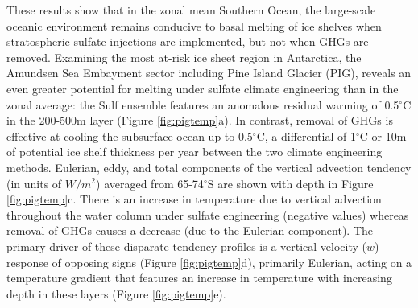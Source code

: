 \documentclass{nature}
\begin{document}
These results show that in the zonal mean Southern Ocean, the large-scale oceanic environment remains conducive to basal melting of ice shelves when stratospheric sulfate injections are implemented, but not when GHGs are removed. Examining the most at-risk ice sheet region in Antarctica, the Amundsen Sea Embayment sector including Pine Island Glacier (PIG), reveals an even greater potential for melting under sulfate climate engineering than in the zonal average: the Sulf ensemble features an anomalous residual warming of 0.5$^\circ$C in the 200-500m layer (Figure \ref{fig:pigtemp}a). In contrast, removal of GHGs is effective at cooling the subsurface ocean up to 0.5$^\circ$C, a differential of 1$^\circ$C or 10m of potential ice shelf thickness per year between the two climate engineering methods. Eulerian, eddy, and total components of the vertical advection tendency (in units of $W/m^2$) averaged from 65-74$^\circ$S are shown with depth in Figure \ref{fig:pigtemp}c. There is an increase in temperature due to vertical advection throughout the water column under sulfate engineering (negative values) whereas removal of GHGs causes a decrease (due to the Eulerian component). The primary driver of these disparate tendency profiles is a vertical velocity ($w$) response of opposing signs (Figure \ref{fig:pigtemp}d), primarily Eulerian, acting on a temperature gradient that features an increase in temperature with increasing depth in these layers (Figure \ref{fig:pigtemp}e). %
\end{document}

